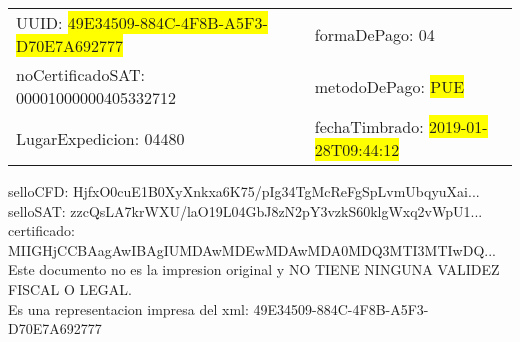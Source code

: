 \documentclass{article}
\begin{document}
\begin{tabular}{p{11cm}p{1cm}p{8cm}}
\bigskip
UUID: \colorbox{yellow}{ 49E34509-884C-4F8B-A5F3-D70E7A692777 } & & formaDePago: 04\\

noCertificadoSAT: 00001000000405332712 & & metodoDePago: \colorbox{yellow}{ PUE }\\

LugarExpedicion: 04480 & & fechaTimbrado: \colorbox{yellow}{ 2019-01-28T09:44:12 } \\
\end{tabular}

\bigskip
selloCFD: HjfxO0cuE1B0XyXnkxa6K75/pIg34TgMcReFgSpLvmUbqyuXai... \\
selloSAT: zzcQsLA7krWXU/laO19L04GbJ8zN2pY3vzkS60klgWxq2vWpU1... \\

certificado: MIIGHjCCBAagAwIBAgIUMDAwMDEwMDAwMDA0MDQ3MTI3MTIwDQ...\bigskip\bigskip\bigskip\bigskip\bigskip\bigskip
\\Este documento no es la impresion original y NO TIENE NINGUNA VALIDEZ FISCAL O LEGAL. \\
 Es una representacion impresa del xml:  49E34509-884C-4F8B-A5F3-D70E7A692777 \\
\end{document}
